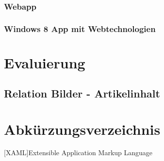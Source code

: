 \documentclass[12pt,a4paper]{scrartcl}
\begin{document}
\subsubsection{Webapp}
\label{webapp}
 
\subsubsection{Windows 8 App mit Webtechnologien}
\label{webwin8}

\newpage
\section{Evaluierung}  
\label{sec:evaluierung}
\subsection{Relation Bilder - Artikelinhalt}
\label{subsec:rel_bilder_artikel} 

\newpage
\section*{Abkürzungsverzeichnis}
\label{sec:abkürzungen}
\begin{acronym}[SEPSEP]
	[XAML]{Extensible Application Markup Language}
\end{acronym}

\newpage
\begin{singlespace}
	
	
\end{singlespace}
\end{document}
